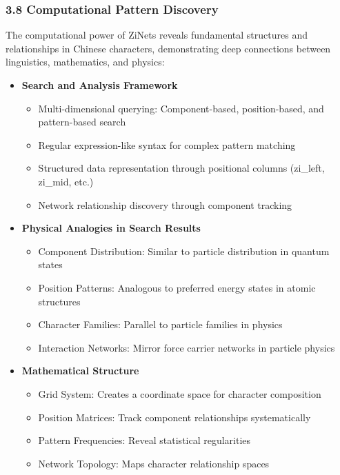 \documentclass[
  11pt,
  letterpaper,
]{article}
\providecommand{\tightlist}{%
  \setlength{\itemsep}{0pt}\setlength{\parskip}{0pt}}
\begin{document}
\subsubsection{3.8 Computational Pattern
Discovery}\label{computational-pattern-discovery}

The computational power of ZiNets reveals fundamental structures and
relationships in Chinese characters, demonstrating deep connections
between linguistics, mathematics, and physics:

\begin{itemize}
\tightlist
\item
  \textbf{Search and Analysis Framework}

  \begin{itemize}
  \tightlist
  \item
    Multi-dimensional querying: Component-based, position-based, and
    pattern-based search
  \item
    Regular expression-like syntax for complex pattern matching
  \item
    Structured data representation through positional columns (zi\_left,
    zi\_mid, etc.)
  \item
    Network relationship discovery through component tracking
  \end{itemize}
\item
  \textbf{Physical Analogies in Search Results}

  \begin{itemize}
  \tightlist
  \item
    Component Distribution: Similar to particle distribution in quantum
    states
  \item
    Position Patterns: Analogous to preferred energy states in atomic
    structures
  \item
    Character Families: Parallel to particle families in physics
  \item
    Interaction Networks: Mirror force carrier networks in particle
    physics
  \end{itemize}
\item
  \textbf{Mathematical Structure}

  \begin{itemize}
  \tightlist
  \item
    Grid System: Creates a coordinate space for character composition
  \item
    Position Matrices: Track component relationships systematically
  \item
    Pattern Frequencies: Reveal statistical regularities
  \item
    Network Topology: Maps character relationship spaces
  \end{itemize}
\end{itemize}
\end{document}
